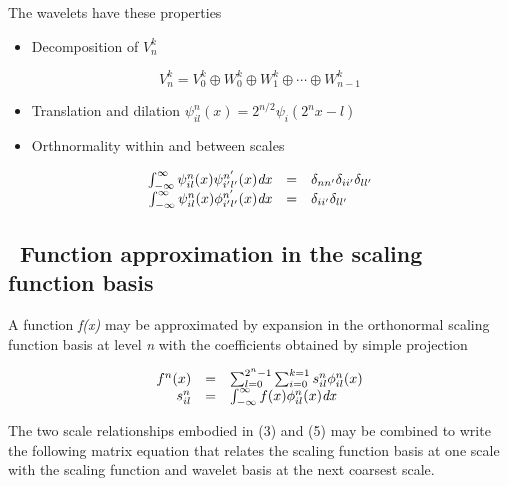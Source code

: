 \documentclass[letterpaper]{book}
\begin{document}
The wavelets have these properties

\begin{itemize}
\item Decomposition of  $V_{n}^{k}$
\end{itemize}
\begin{equation}\label{seq:refText5}
V_{n}^{k}=V_{0}^{k}\oplus W_{0}^{k}\oplus W_{1}^{k}\oplus \cdots \oplus W_{n-1}^{k}
\end{equation}

\begin{itemize}
\item Translation and dilation  $\psi _{il}^{n}(x)=2^{n/2}\psi _{i}(2^{n}x-l)$
\item Orthnormality within and between scales
\end{itemize}
\begin{equation}
\begin{matrix}\hfill \int _{-\infty }^{\infty }\psi _{il}^{n}(x)\psi _{i'l'}^{n'}(x)\mathit{dx}&\text{=}&\delta
_{nn'}\delta _{ii'}\delta _{ll'}\\\hfill \int _{-\infty }^{\infty }\psi _{il}^{n}(x)\phi
_{i'l'}^{n'}(x)\mathit{dx}&\text{=}&\delta _{ii'}\delta _{ll'}\hfill\null \end{matrix}
\end{equation}
\subsection[\ Function approximation in the scaling function basis]{\ Function approximation in the scaling function
basis}
A function \textit{f(x)} may be approximated by expansion in the orthonormal scaling function basis at level \textit{n
}with the coefficients obtained by simple projection

\begin{equation}\label{seq:refText7}
\begin{matrix}\hfill f^{n}(x)&\text{=}&\sum _{l=0}^{2^{n}-1}\sum _{i=0}^{k=1}s_{il}^{n}\phi _{il}^{n}(x)\hfill\null
\\\hfill s_{il}^{n}&\text{=}&\int _{-\infty }^{\infty }f(x)\phi _{il}^{n}(x)\mathit{dx}\hfill\null \end{matrix}
\end{equation}

\bigskip

The two scale relationships embodied in (3) and (5) may be combined to write the following matrix equation that relates
the scaling function basis at one scale with the scaling function and wavelet basis at the next coarsest scale.
\end{document}
